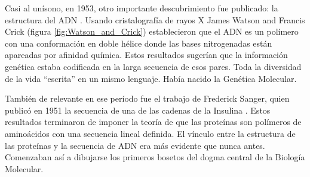Casi al unísono, en 1953, otro importante descubrimiento fue publicado: la estructura del ADN \cite{watsonMolecularStructureNucleic1953}.
Usando cristalografía de rayos X James Watson and Francis Crick (figura \ref{fig:Watson_and_Crick}) establecieron que el ADN es un polímero con una conformación en doble hélice donde las bases nitrogenadas están apareadas por afinidad química.
Estos resultados sugerían que la información genética estaba codificada en la larga secuencia de esos pares.
Toda la diversidad de la vida ``escrita'' en un mismo lenguaje.
Había nacido la Genética Molecular.

También de relevante en ese período fue el trabajo de Frederick Sanger, quien publicó en 1951 la secuencia de una de las cadenas de la Insulina \cite{sangerAminoacidSequencePhenylalanyl1951}.
Estos resultados terminaron de imponer la teoría de que las proteínas son polímeros de aminoácidos con una secuencia lineal definida.
El vínculo entre la estructura de las proteínas y la secuencia de ADN era más evidente que nunca antes.
Comenzaban así a dibujarse los primeros bosetos del dogma central de la Biología Molecular.
